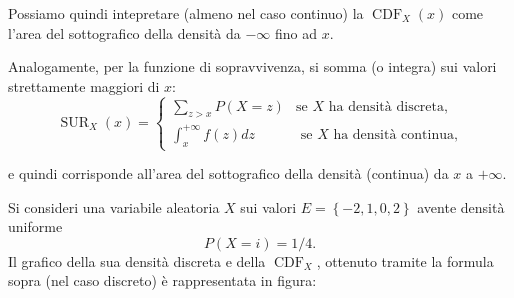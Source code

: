 \documentclass[
  italian,
  letterpaper,
]{book}
\newcommand{\cur}[1]{\left\{ #1 \right\}}
\newcommand{\SUR}{\operatorname{SUR}}
\newcommand{\CDF}{\operatorname{CDF}}
\theoremstyle{definition}
\theoremstyle{remark}
\begin{document}
Possiamo quindi intepretare (almeno nel caso continuo) la \(\CDF_X(x)\)
come l'area del sottografico della densità da \(-\infty\) fino ad \(x\).

Analogamente, per la funzione di sopravvivenza, si somma (o integra) sui
valori strettamente maggiori di \(x\): \[ \SUR_X(x) = \begin{cases} 
\sum_{  z > x} P(X = z ) & \text{se $X$ ha densità discreta,}\\
\int_x ^{+\infty} f(z) d z & \text{ se $X$ ha densità continua,}\end{cases}\]

e quindi corrisponde all'area del sottografico della densità (continua)
da \(x\) a \(+\infty\).

Si consideri una variabile aleatoria \(X\) sui valori
\(E = \cur{-2,1,0,2}\) avente densità uniforme \[ P(X =i ) = 1/4.\] Il
grafico della sua densità discreta e della \(\CDF_X\), ottenuto tramite
la formula sopra (nel caso discreto) è rappresentata in figura:
\end{document}
